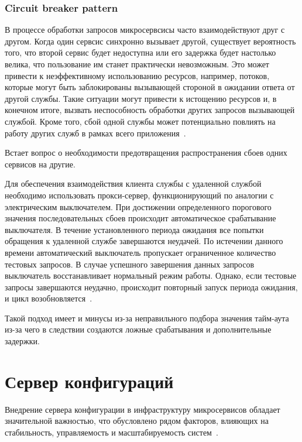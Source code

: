 \subsubsection{Circuit breaker pattern}

В процессе обработки запросов микросервсисы часто взаимодействуют друг с другом.
Когда один сервсис
синхронно вызывает другой, существует вероятность того, что второй сервис будет недоступна или его
задержка будет настолько велика, что пользование им станет практически невозможным.
Это может
привести к неэффективному использованию ресурсов, например, потоков, которые могут быть
заблокированы вызывающей стороной в ожидании ответа от другой службы.
Такие ситуации могут привести
к истощению ресурсов и, в конечном итоге, вызвать неспособность обработки других запросов вызывающей
службой.
Кроме того, сбой одной службы может потенциально повлиять на работу других служб в рамках
всего приложения~\cite{circuit_breaker}.

Встает вопрос о необходимости предотвращения распространения сбоев одних сервисов на другие.

Для обеспечения взаимодействия клиента службы с удаленной службой необходимо использовать
прокси-сервер, функционирующий по аналогии с электрическим выключателем.
При достижении
определенного порогового значения последовательных сбоев происходит автоматическое срабатывание
выключателя.
В течение установленного периода ожидания все попытки обращения к удаленной службе
завершаются неудачей.
По истечении данного времени автоматический выключатель пропускает
ограниченное количество тестовых запросов.
В случае успешного завершения данных запросов выключатель
восстанавливает нормальный режим работы.
Однако, если тестовые запросы завершаются неудачно,
происходит повторный запуск периода ожидания, и цикл
возобновляется~\cite{microservice_pattern}.

Такой подход имеет и минусы из-за неправильного подбора значения тайм-аута из-за чего в следствии
создаются ложные срабатывания и дополнительные задержки.


\section{Сервер конфигураций}

Внедрение сервера конфигурации в инфраструктуру микросервисов обладает значительной важностью, что обусловлено рядом
факторов, влияющих на стабильность, управляемость и масштабируемость систем~\cite{carnell2021spring}.


